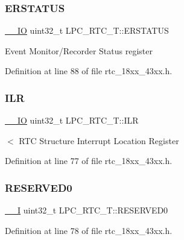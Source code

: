 \subsubsection{\texorpdfstring{E\+R\+S\+T\+A\+T\+US}{ERSTATUS}}
{\footnotesize\ttfamily \hyperlink{core__sc300_8h_aec43007d9998a0a0e01faede4133d6be}{\+\_\+\+\_\+\+IO} uint32\+\_\+t L\+P\+C\+\_\+\+R\+T\+C\+\_\+\+T\+::\+E\+R\+S\+T\+A\+T\+US}

Event Monitor/\+Recorder Status register 

Definition at line 88 of file rtc\+\_\+18xx\+\_\+43xx.\+h.

\mbox{\label{struct_l_p_c___r_t_c___t_a6e1debaa7074a0fae4767a70f9abff29}} 
\subsubsection{\texorpdfstring{I\+LR}{ILR}}
{\footnotesize\ttfamily \hyperlink{core__sc300_8h_aec43007d9998a0a0e01faede4133d6be}{\+\_\+\+\_\+\+IO} uint32\+\_\+t L\+P\+C\+\_\+\+R\+T\+C\+\_\+\+T\+::\+I\+LR}

$<$ R\+TC Structure Interrupt Location Register 

Definition at line 77 of file rtc\+\_\+18xx\+\_\+43xx.\+h.

\mbox{\label{struct_l_p_c___r_t_c___t_a94d0c8bf3402d34aac9170bac01bb4fb}} 
\subsubsection{\texorpdfstring{R\+E\+S\+E\+R\+V\+E\+D0}{RESERVED0}}
{\footnotesize\ttfamily \hyperlink{core__sc300_8h_af63697ed9952cc71e1225efe205f6cd3}{\+\_\+\+\_\+I} uint32\+\_\+t L\+P\+C\+\_\+\+R\+T\+C\+\_\+\+T\+::\+R\+E\+S\+E\+R\+V\+E\+D0}



Definition at line 78 of file rtc\+\_\+18xx\+\_\+43xx.\+h.

\mbox{\label{struct_l_p_c___r_t_c___t_aba6975085fa7b58735e0227bf956eaab}} 
